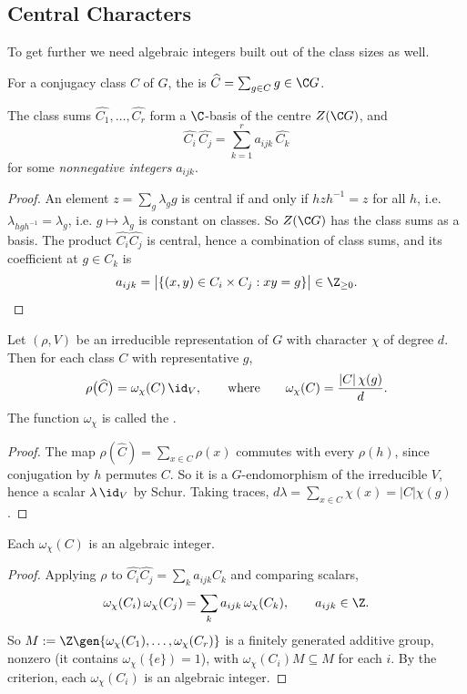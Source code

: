 \subsection{Central Characters}

To get further we need algebraic integers built out of the class sizes as well.

\begin{definition}
	For a conjugacy class $C$ of $G$, the  is $\widehat C = \sum_{g\in C}g \in \C G$.
\end{definition}

\begin{proposition}
	The class sums $\widehat{C_1},\dots,\widehat{C_r}$ form a $\C$-basis of the centre $Z(\C G)$, and
	$$\widehat{C_i}\,\widehat{C_j} = \sum_{k=1}^r a_{ijk}\,\widehat{C_k}$$
	for some \emph{nonnegative integers} $a_{ijk}$.
\end{proposition}
\begin{proof}
	An element $z = \sum_g\lambda_gg$ is central if and only if $hzh^{-1} = z$ for all $h$, i.e. $\lambda_{hgh^{-1}} = \lambda_g$, i.e. $g\mapsto\lambda_g$ is constant on classes. So $Z(\C G)$ has the class sums as a basis. The product $\widehat{C_i}\widehat{C_j}$ is central, hence a combination of class sums, and its coefficient at $g\in C_k$ is
	$$a_{ijk} = \big|\{(x,y)\in C_i\times C_j : xy = g\}\big| \in \Z_{\geq0}. \qedhere
	$$
\end{proof}

\begin{proposition}
	Let $(\rho,V)$ be an irreducible representation of $G$ with character $\chi$ of degree $d$. Then for each class $C$ with representative $g$,
	$$\rho\big(\widehat C\big) = \omega_\chi(C)\,\id_V, \qquad\text{where}\qquad \omega_\chi(C) = \frac{|C|\,\chi(g)}{d}.$$
	The function $\omega_\chi$ is called the .
\end{proposition}
\begin{proof}
	The map $\rho(\widehat C) = \sum_{x\in C}\rho(x)$ commutes with every $\rho(h)$, since conjugation by $h$ permutes $C$. So it is a $G$-endomorphism of the irreducible $V$, hence a scalar $\lambda\,\id_V$ by Schur. Taking traces, $d\lambda = \sum_{x\in C}\chi(x) = |C|\chi(g)$.
\end{proof}

\begin{proposition}
	Each $\omega_\chi(C)$ is an algebraic integer.
\end{proposition}
\begin{proof}
	Applying $\rho$ to $\widehat{C_i}\widehat{C_j} = \sum_ka_{ijk}\widehat{C_k}$ and comparing scalars,
	$$\omega_\chi(C_i)\,\omega_\chi(C_j) = \sum_{k}a_{ijk}\,\omega_\chi(C_k), \qquad a_{ijk}\in\Z.$$
	So $M := \Z\gen{\omega_\chi(C_1),\dots,\omega_\chi(C_r)}$ is a finitely generated additive group, nonzero (it contains $\omega_\chi(\{e\}) = 1$), with $\omega_\chi(C_i)M\subseteq M$ for each $i$. By the criterion, each $\omega_\chi(C_i)$ is an algebraic integer.
\end{proof}

